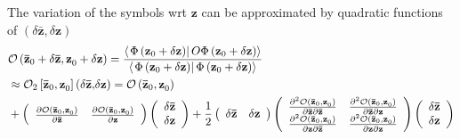 \documentclass[aps,preprint]{revtex4}%
\begin{document}
The variation of the symbols wrt $\mathbf{z}$ can be approximated by quadratic
functions of $\left(  \delta\mathbf{\bar{z},}\delta\mathbf{z}\right)  $
\begin{align}
&  \mathcal{O}\left(  \mathbf{\bar{z}}_{0}+\delta\mathbf{\bar{z},z}_{0}%
+\delta\mathbf{z}\right)  =\frac{\left\langle \left.  \Phi\left(
\mathbf{z}_{0}+\delta\mathbf{z}\right)  \right\vert O\Phi\left(
\mathbf{z}_{0}+\delta\mathbf{z}\right)  \right\rangle }{\left\langle \left.
\Phi\left(  \mathbf{z}_{0}+\delta\mathbf{z}\right)  \right\vert \Phi\left(
\mathbf{z}_{0}+\delta\mathbf{z}\right)  \right\rangle }\nonumber\\
&  \approx\mathcal{O}_{2}\left[  \mathbf{\bar{z}}_{0}\mathbf{,z}_{0}\right]
\left(  \delta\mathbf{\bar{z},}\delta\mathbf{z}\right)  =\mathcal{O}\left(
\mathbf{\bar{z}}_{0}\mathbf{,z}_{0}\right) \nonumber\\
&  +\left(
\begin{array}
[c]{cc}%
\frac{\partial\mathcal{O}\left(  \mathbf{\bar{z}}_{0}\mathbf{,z}_{0}\right)
}{\partial\mathbf{\bar{z}}} & \frac{\partial\mathcal{O}\left(  \mathbf{\bar
{z}}_{0}\mathbf{,z}_{0}\right)  }{\partial\mathbf{z}}%
\end{array}
\right)  \left(
\begin{array}
[c]{c}%
\delta\mathbf{\bar{z}}\\
\delta\mathbf{z}%
\end{array}
\right)  +\frac{1}{2}\left(
\begin{array}
[c]{cc}%
\delta\mathbf{\bar{z}} & \delta\mathbf{z}%
\end{array}
\right)  \left(
\begin{array}
[c]{cc}%
\frac{\partial^{2}\mathcal{O}\left(  \mathbf{\bar{z}}_{0}\mathbf{,z}%
_{0}\right)  }{\partial\mathbf{\bar{z}}\partial\mathbf{\bar{z}}} &
\frac{\partial^{2}\mathcal{O}\left(  \mathbf{\bar{z}}_{0}\mathbf{,z}%
_{0}\right)  }{\partial\mathbf{\bar{z}}\partial\mathbf{z}}\\
\frac{\partial^{2}\mathcal{O}\left(  \mathbf{\bar{z}}_{0}\mathbf{,z}%
_{0}\right)  }{\partial\mathbf{z}\partial\mathbf{\bar{z}}} & \frac
{\partial^{2}\mathcal{O}\left(  \mathbf{\bar{z}}_{0}\mathbf{,z}_{0}\right)
}{\partial\mathbf{z}\partial\mathbf{z}}%
\end{array}
\right)  \left(
\begin{array}
[c]{c}%
\delta\mathbf{\bar{z}}\\
\delta\mathbf{z}%
\end{array}
\right)
\end{align}
\end{document}
